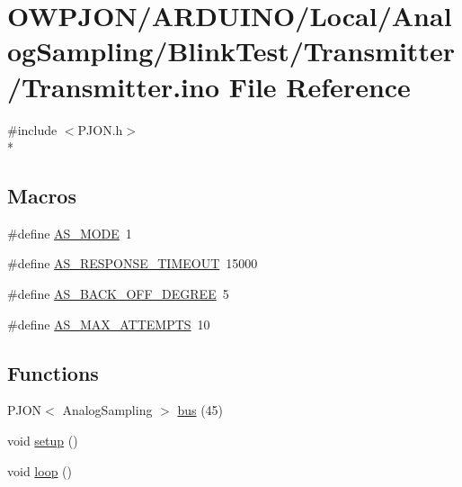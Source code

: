 \hypertarget{Transmitter_8ino}{\section{O\-W\-P\-J\-O\-N/\-A\-R\-D\-U\-I\-N\-O/\-Local/\-Analog\-Sampling/\-Blink\-Test/\-Transmitter/\-Transmitter.ino File Reference}
\label{Transmitter_8ino}
}
{\ttfamily \#include $<$P\-J\-O\-N.\-h$>$}\\*
\subsection*{Macros}
\begin{DoxyCompactItemize}
\item 
\#define \hyperlink{Transmitter_8ino_a4e74dbda50d34621af93621e67294482}{A\-S\-\_\-\-M\-O\-D\-E}~1
\item 
\#define \hyperlink{Transmitter_8ino_ab93065a204a9cfd4c1857a3ae70eb93a}{A\-S\-\_\-\-R\-E\-S\-P\-O\-N\-S\-E\-\_\-\-T\-I\-M\-E\-O\-U\-T}~15000
\item 
\#define \hyperlink{Transmitter_8ino_ae52002e6f7038dfa1b1233b8c8f8fffe}{A\-S\-\_\-\-B\-A\-C\-K\-\_\-\-O\-F\-F\-\_\-\-D\-E\-G\-R\-E\-E}~5
\item 
\#define \hyperlink{Transmitter_8ino_ac34d08b3c89dbfda92dec678ab6a7a2e}{A\-S\-\_\-\-M\-A\-X\-\_\-\-A\-T\-T\-E\-M\-P\-T\-S}~10
\end{DoxyCompactItemize}
\subsection*{Functions}
\begin{DoxyCompactItemize}
\item 
P\-J\-O\-N$<$ Analog\-Sampling $>$ \hyperlink{Transmitter_8ino_ad7e6cfe9e90d54b8f317bfc79bcd5e03}{bus} (45)
\item 
void \hyperlink{Transmitter_8ino_a4fc01d736fe50cf5b977f755b675f11d}{setup} ()
\item 
void \hyperlink{Transmitter_8ino_afe461d27b9c48d5921c00d521181f12f}{loop} ()
\end{DoxyCompactItemize}


